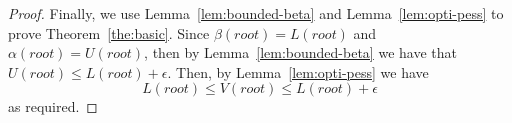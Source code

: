 \documentclass[runningheads]{llncs}
\newcommand{\MM}{\mathit{V}}
\newcommand{\pess}{\mathit{L}}
\newcommand{\opti}{\mathit{U}}
\newcommand{\vmax}{v_{\text{max}}}
\newcommand{\vmin}{v_{\text{min}}}
\begin{document}
\begin{proof}





Finally, we use Lemma~\ref{lem:bounded-beta} and Lemma~\ref{lem:opti-pess} to prove Theorem~\ref{the:basic}. 
Since $\beta(root)=\pess(root)$ 
and $\alpha(root)=\opti(root)$, then by Lemma~\ref{lem:bounded-beta} we have that
$\opti(root)\leq \pess(root)+\epsilon$.
Then, by Lemma~\ref{lem:opti-pess} we have
\begin{equation}
\pess(root) \leq \MM(root) \leq \pess(root)+\epsilon
\end{equation}
as required.
\end{proof}



\end{document}
